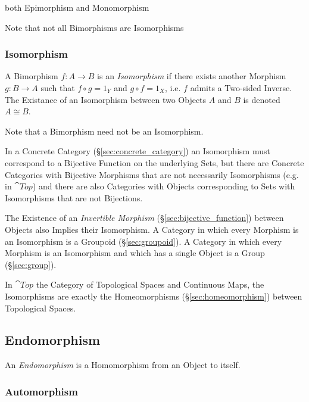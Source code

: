 both Epimorphism and Monomorphism

\fist Note that not all Bimorphisms are Isomorphisms



\subsubsection{Isomorphism}\label{sec:isomorphism}

A Bimorphism $f : A \rightarrow B$ is an \emph{Isomorphism} if there
exists another Morphism $g : B \rightarrow A$ such that $f \circ g =
1_Y$ and $g \circ f = 1_X$, i.e. $f$ admits a Two-sided Inverse. The
Existance of an Isomorphism between two Objects $A$ and $B$ is denoted
$A \cong B$.

\fist Note that a Bimorphism need not be an Isomorphism.

In a Concrete Category (\S\ref{sec:concrete_category}) an Isomorphism
must correspond to a Bijective Function on the underlying Sets, but
there are Concrete Categories with Bijective Morphisms that are not
necessarily Isomorphisms (e.g. in $\cat{Top}$) and there are also
Categories with Objects corresponding to Sets with Isomorphisms that
are not Bijections.

The Existence of an \emph{Invertible Morphism}
(\S\ref{sec:bijective_function}) between Objects also Implies their
Isomorphism. A Category in which every Morphism is an Isomorphism is a
Groupoid (\S\ref{sec:groupoid}). A Category in which every Morphism is
an Isomorphism and which has a single Object is a Group
(\S\ref{sec:group}).

In $\cat{Top}$ the Category of Topological Spaces and Continuous
Maps, the Isomorphisms are exactly the Homeomorphisms
(\S\ref{sec:homeomorphism}) between Topological Spaces.



\subsection{Endomorphism}\label{sec:endomorphism}

An \emph{Endomorphism} is a Homomorphism from an Object to itself.



\subsubsection{Automorphism}\label{sec:automorphism}

